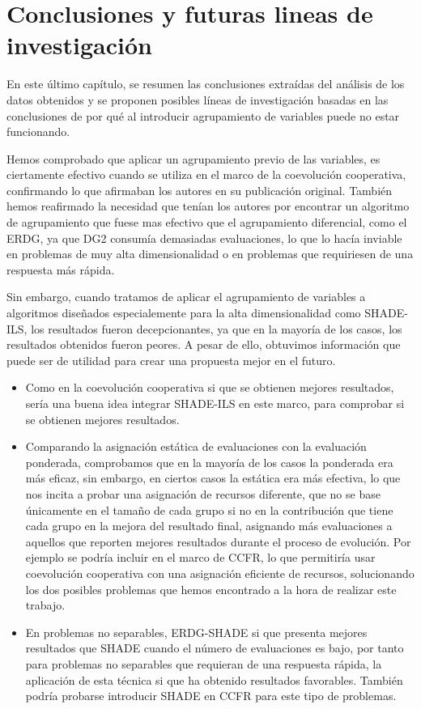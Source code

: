 
\chapter{Conclusiones y futuras lineas de investigación}
En este último capítulo, se resumen las conclusiones extraídas del análisis de los datos obtenidos y se proponen posibles líneas de investigación basadas en las conclusiones de por qué al introducir agrupamiento de variables puede no estar funcionando.

Hemos comprobado que aplicar un agrupamiento previo de las variables, es ciertamente efectivo cuando se utiliza en el marco de la coevolución cooperativa, confirmando lo que afirmaban los autores en su publicación original. También hemos reafirmado la necesidad que tenían los autores por encontrar un algoritmo de agrupamiento que fuese mas efectivo que el agrupamiento diferencial, como el ERDG, ya que DG2 consumía demasiadas evaluaciones, lo que lo hacía inviable en problemas de muy alta dimensionalidad o en problemas que requiriesen de una respuesta más rápida.

Sin embargo, cuando tratamos de aplicar el agrupamiento de variables a algoritmos diseñados especialemente para la alta dimensionalidad como SHADE-ILS, los resultados fueron decepcionantes, ya que en la mayoría de los casos, los resultados obtenidos fueron peores. A pesar de ello, obtuvimos información que puede ser de utilidad para crear una propuesta mejor en el futuro.

\begin{itemize}
	\item Como en la coevolución cooperativa si que se obtienen mejores resultados, sería una buena idea integrar SHADE-ILS en este marco, para comprobar si se obtienen mejores resultados.

	\item Comparando la asignación estática de evaluaciones con la evaluación ponderada, comprobamos que en la mayoría de los casos la ponderada era más eficaz, sin embargo, en ciertos casos la estática era más efectiva, lo que nos incita a probar una asignación de recursos diferente, que no se base únicamente en el tamaño de cada grupo si no en la contribución que tiene cada grupo en la mejora del resultado final, asignando más evaluaciones a aquellos que reporten mejores resultados durante el proceso de evolución. Por ejemplo se podría incluir en el marco de CCFR, lo que permitiría usar coevolución cooperativa con una asignación eficiente de recursos, solucionando los dos posibles problemas que hemos encontrado a la hora de realizar este trabajo.
	
	\item En problemas no separables, ERDG-SHADE si que presenta mejores resultados que SHADE cuando el número de evaluaciones es bajo, por tanto para problemas no separables que requieran de una respuesta rápida, la aplicación de esta técnica si que ha obtenido resultados favorables. También podría probarse introducir SHADE en CCFR para este tipo de problemas.
\end{itemize}

